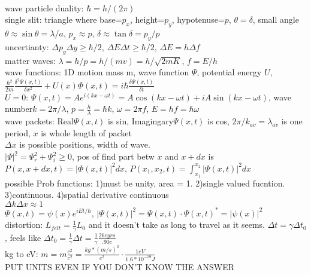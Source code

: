 \documentclass{article}
\begin{document}
\begin{large}
\\wave particle duality: $\hbar=h/(2\pi)$
\\single slit: triangle where base=$p_x$, height=$p_y$, hypotenuse=$p$, $\theta=\delta$, small angle $\theta\approx\sin\theta=\lambda/a$, $p_x\approx p$, $\delta\approx\tan\delta=p_y/p$
\\uncertianty: $\Delta p_y\Delta y\ge\hbar/2$, $\Delta E\Delta t\ge\hbar/2$, $\Delta E=h\Delta f$
\\matter waves: $\lambda = h/p=h/(mv)=h/\sqrt{2mK}$, $f=E/h$
\\wave functions: 1D motion mass m, wave function $\Psi$, potential energy $U$, $\frac{\hbar^2}{2m}\frac{\delta^2\Psi(x,t)}{\delta x^2}+U(x)\Phi(x,t)=i\hbar\frac{\delta\Psi(x,t)}{\delta t}$
\\$U=0$: $\Psi(x,t)=Ae^{i(kx-\omega t)}=A\cos(kx-\omega t)+iA\sin(kx-\omega t)$, wave number$k=2\pi/\lambda$, $p=\frac{h}{\lambda}=\hbar k$, $\omega=2\pi f$, $E=hf=\hbar\omega$
\\wave packets: Real$\Psi(x,t)$ is sin, Imagingary$\Psi(x,t)$ is cos, $2\pi/k_{av}=\lambda_{av}$ is one period, $x$ is whole length of packet
\\$\Delta x$ is possible positions, width of wave.
\\$|\Psi|^2=\Psi_r^2+\Psi_i^2\ge0$, pos of find part betw $x$ and $x+dx$ is $P(x,x+dx,t)=|\Phi(x,t)|^2dx$, $P(x_1,x_2,t)=\int_{x_1}^{x_2}|\Psi(x,t)|^2dx$
\\possible Prob functions: 1)must be unity, area = 1. 2)single valued fucntion. 3)continuous. 4)spatial derivative continuous
\\$\Delta k\Delta x\approx 1$
\\$\Psi(x,t)=\psi(x)e^{iEt/\hbar}$, $|\Psi(x,t)|^2=\Psi(x,t)\cdot\Psi(x,t)^*=|\psi(x)|^2$
\\distortion: $L_{felt}=\frac{1}{\gamma}L_0$ and it doesn't take as long to travel as it seems. $\Delta t=\gamma\Delta t_0$, feels like $\Delta t_0=\frac{1}{\gamma}\Delta t=\frac{1}{\gamma}\frac{26 c yrs}{.90 c}$
\\kg to eV: $m=m\frac{c^2}{c^2}=\frac{kg*(m/s)^2}{c^2}\cdot\frac{1eV}{1.6*10^{-19}J}$
\\PUT UNITS EVEN IF YOU DON'T KNOW THE ANSWER



\end{large}
\end{document}
